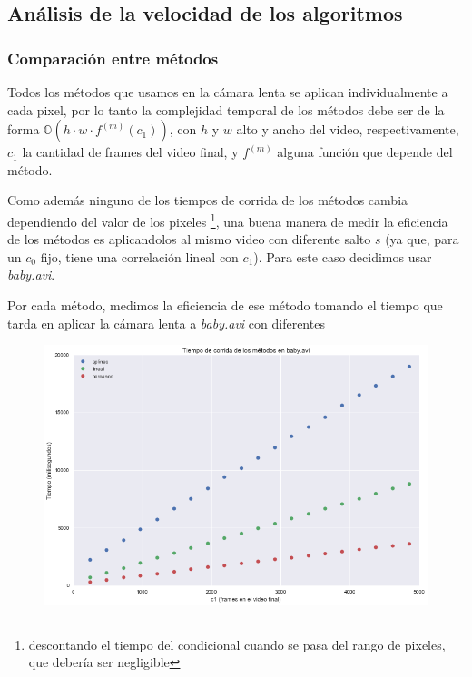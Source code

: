 \subsection{An\'alisis de la velocidad de los algoritmos}

\subsubsection{Comparaci\'on entre m\'etodos}

Todos los m\'etodos que usamos en la c\'amara lenta se aplican individualmente a
cada pixel, por lo tanto la complejidad temporal de los m\'etodos debe ser de la
forma $ \mathbb{O}(h \cdot w \cdot f^{(m)}(c_1)) $, con $h$ y $w$ alto y ancho del
video, respectivamente, $c_1$ la cantidad de frames del video final, y $f^{(m)}$
alguna funci\'on que depende del m\'etodo.

Como adem\'as ninguno de los tiempos de corrida de los m\'etodos cambia
dependiendo del valor de los pixeles \footnote{descontando el tiempo del
condicional cuando se pasa del rango de pixeles, que deber\'ia ser negligible},
una buena manera de medir la eficiencia de los m\'etodos es aplicandolos al
mismo video con diferente salto $s$ (ya que, para un $c_0$ fijo, tiene una
correlaci\'on lineal con $c_1$). Para este caso decidimos usar
\textit{baby.avi}.

Por cada m\'etodo, medimos la eficiencia de ese m\'etodo tomando el tiempo que
tarda en aplicar la c\'amara lenta a \textit{baby.avi} con diferentes 

\begin{figure}[H]
\centering
\includegraphics[width=.95\textwidth]{graficos/tiempo_baby.png}
\end{figure}


